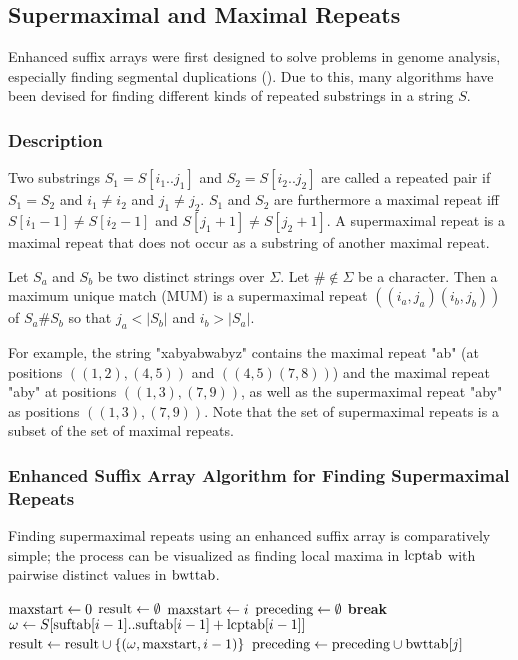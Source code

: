 \documentclass[a4paper,10pt]{article}
\begin{document}
\subsection*{Supermaximal and Maximal Repeats}

Enhanced suffix arrays were first designed to solve problems
in genome analysis, especially finding segmental duplications
(\citealt{lander2001initial}). Due to this, many algorithms have been
devised for finding different kinds of repeated substrings in a string
$S$.

\subsubsection*{Description}

Two substrings $S_1=S[i_1..j_1]$ and $S_2=S[i_2..j_2]$ are called a
repeated pair if $S_1=S_2$ and $i_1 \ne i_2$ and $j_1 \ne j_2$.  $S_1$
and $S_2$ are furthermore a maximal repeat iff $S[i_1-1] \ne S[i_2-1]$
and $S[j_1+1] \ne S[j_2+1]$. A supermaximal repeat is a maximal repeat
that does not occur as a substring of another maximal repeat.

Let $S_a$ and $S_b$ be two distinct strings over $\Sigma$. Let $\#
\not \in \Sigma$ be a character. Then a maximum unique match (MUM) is
a supermaximal repeat $((i_a, j_a)(i_b, j_b))$ of $S_a\#S_b$ so that
$j_a<|S_b|$ and $i_b>|S_a|$.

For example, the string "xabyabwabyz" contains the maximal repeat "ab"
(at positions $((1,2),(4,5))$ and $((4,5)(7,8))$) and the maximal repeat
"aby" at positions $((1,3),(7,9))$, as well as the supermaximal repeat
"aby" as positions $((1,3),(7,9))$. Note that the set of supermaximal
repeats is a subset of the set of maximal repeats.

\subsubsection*{Enhanced Suffix Array Algorithm for Finding Supermaximal Repeats}

Finding supermaximal repeats using an enhanced suffix array is
comparatively simple; the process can be visualized as finding
local maxima in $\hbox{lcptab}$  with pairwise distinct values in
$\hbox{bwttab}$.

\begin{algorithmic}
\State $\hbox{maxstart} \gets 0$
\State $\hbox{result} \gets \emptyset$
		\State $\hbox{maxstart} \gets i$
		\State $\hbox{preceding} \gets \emptyset$
				\State \textbf{break}
			\EndIf
				\State $\omega \gets S[\hbox{suftab}[i-1]..\hbox{suftab}[i-1] +\hbox{lcptab}[i-1]]$
				\State $\hbox{result} \gets \hbox{result} \cup \{(\omega, \hbox{maxstart}, i-1)\}$
			\EndIf
			\State $\hbox{preceding} \gets \hbox{preceding} \cup \hbox{bwttab}[j]$
		\EndFor
	\EndIf
\EndFor
\end{algorithmic}
\end{document}
